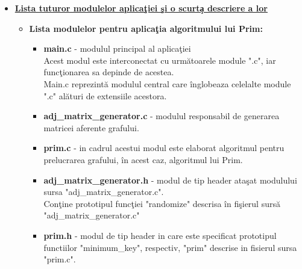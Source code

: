 \documentclass[14pt]{article}
\begin{document}
\begin{itemize}
\item
\underline{\Large\textbf{Lista tuturor modulelor aplica\c tiei \c si o scurt\c a descriere a lor}}

\vspace{1mm}

\begin{itemize}
    \item \textbf{Lista modulelor pentru aplica\c tia algoritmului lui Prim:}
    \\
    \begin{itemize}
        \item \textbf{main.c} - modulul principal al aplica\c tiei\\
    Acest modul este interconectat cu urm\u{a}toarele module ".c", iar func\c tionarea sa depinde de acestea.\\
    Main.c reprezint\u{a} modulul central care \^inglobeaza celelalte module ".c" al\u{a}turi de extensiile acestora.
        \item \textbf{adj\_matrix\_generator.c} - modulul responsabil de generarea matricei aferente grafului.
        \item \textbf{prim.c} - in cadrul acestui modul este elaborat algoritmul pentru prelucrarea grafului, \^in acest caz, algoritmul lui Prim.
        \item \textbf{adj\_matrix\_generator.h} - modul de tip header ata\c sat modulului sursa "adj\_matrix\_generator.c".\\
        Con\c tine prototipul func\c tiei "randomize" descrisa \^in  fi\c sierul surs\u{a} "adj\_matrix\_generator.c"
        \item \textbf{prim.h} - modul de tip header in care este specificat prototipul functiilor "minimum\_key", respectiv, "prim" descrise in fisierul sursa "prim.c".
        \\
    \end{itemize}
    

\end{itemize}
\end{itemize}
\end{document}
